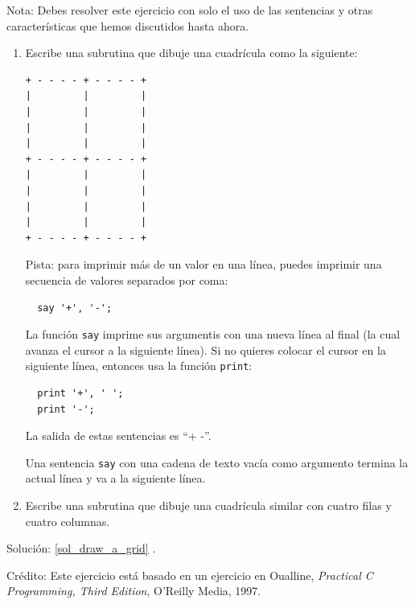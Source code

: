 \begin{exercise}
\label{draw_a_grid}

Nota: Debes resolver este ejercicio con solo el uso de
las sentencias y otras características que hemos
discutidos hasta ahora.

\begin{enumerate}

\item Escribe una subrutina que dibuje una cuadrícula como 
la siguiente:

\begin{lstlisting}
+ - - - - + - - - - +
|         |         |
|         |         |
|         |         |
|         |         |
+ - - - - + - - - - +
|         |         |
|         |         |
|         |         |
|         |         |
+ - - - - + - - - - +
\end{lstlisting}
%
Pista: para imprimir más de un valor en una línea, puedes
imprimir una secuencia de valores separados por coma:

\begin{lstlisting}
  say '+', '-';
\end{lstlisting}
%
La función {\tt say} imprime sus argumentis con una nueva línea
al final (la cual avanza el cursor a la siguiente línea). Si no
quieres colocar el cursor en la siguiente línea, entonces usa
la función {\tt print}:

\begin{lstlisting}
  print '+', ' ';
  print '-';
\end{lstlisting}
%
La salida de estas sentencias es ``+ -''.

Una sentencia {\tt say} con una cadena de texto vacía como
argumento termina la actual línea y va a la siguiente
línea.

\item Escribe una subrutina que dibuje una cuadrícula similar con
cuatro filas y cuatro columnas.

\end{enumerate}

Solución: \ref{sol_draw_a_grid}
.

Crédito: Este ejercicio está basado en un ejercicio en Oualline, {\em
    Practical C Programming, Third Edition}, O'Reilly Media, 1997.

\end{exercise}

